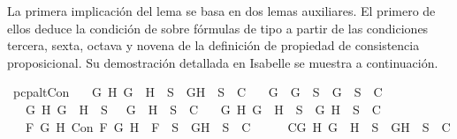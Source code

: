 \begin{isabellebody}
\begin{isamarkuptext}
  La primera implicación del lema se basa en dos lemas auxiliares. El primero de ellos 
  deduce la condición de  sobre fórmulas de tipo \isa{{\isasymalpha}} a partir de las condiciones tercera, sexta, 
  octava y novena de la definición de propiedad de consistencia proposicional. Su demostración 
  detallada en Isabelle se muestra a continuación.%
\end{isamarkuptext}\isamarkuptrue%
\isamarkupfalse%
\ pcp{\isacharunderscore}alt{}Con{\isacharcolon}\isanewline
\ \ \ {\isachardoublequoteopen}{\isacharparenleft}{\isasymforall}G\ H{\isachardot}\ G\ \isactrlbold {\isasymand}\ H\ {\isasymin}\ S\ {\isasymlongrightarrow}\ {\isacharbraceleft}G{\isacharcomma}H{\isacharbraceright}\ {\isasymunion}\ S\ {\isasymin}\ C{\isacharparenright}\isanewline
\ \ {\isasymand}\ {\isacharparenleft}{\isasymforall}G{\isachardot}\ \isactrlbold {\isasymnot}\ {\isacharparenleft}\isactrlbold {\isasymnot}G{\isacharparenright}\ {\isasymin}\ S\ {\isasymlongrightarrow}\ {\isacharbraceleft}G{\isacharbraceright}\ {\isasymunion}\ S\ {\isasymin}\ C{\isacharparenright}\isanewline
\ \ {\isasymand}\ {\isacharparenleft}{\isasymforall}G\ H{\isachardot}\ \isactrlbold {\isasymnot}{\isacharparenleft}G\ \isactrlbold {\isasymor}\ H{\isacharparenright}\ {\isasymin}\ S\ {\isasymlongrightarrow}\ {\isacharbraceleft}\isactrlbold {\isasymnot}\ G{\isacharcomma}\ \isactrlbold {\isasymnot}\ H{\isacharbraceright}\ {\isasymunion}\ S\ {\isasymin}\ C{\isacharparenright}\isanewline
\ \ {\isasymand}\ {\isacharparenleft}{\isasymforall}G\ H{\isachardot}\ \isactrlbold {\isasymnot}{\isacharparenleft}G\ \isactrlbold {\isasymrightarrow}\ H{\isacharparenright}\ {\isasymin}\ S\ {\isasymlongrightarrow}\ {\isacharbraceleft}G{\isacharcomma}\isactrlbold {\isasymnot}\ H{\isacharbraceright}\ {\isasymunion}\ S\ {\isasymin}\ C{\isacharparenright}{\isachardoublequoteclose}\isanewline
\ \ \ {\isachardoublequoteopen}{\isasymforall}F\ G\ H{\isachardot}\ Con\ F\ G\ H\ {\isasymlongrightarrow}\ F\ {\isasymin}\ S\ {\isasymlongrightarrow}\ {\isacharbraceleft}G{\isacharcomma}H{\isacharbraceright}\ {\isasymunion}\ S\ {\isasymin}\ C{\isachardoublequoteclose}\isanewline
%
\isadelimproof
%
\endisadelimproof
%
\isatagproof
{}\isamarkupfalse%
\ {\isacharminus}\isanewline
\ \ \isamarkupfalse%
\ C{}{\isacharcolon}{\isachardoublequoteopen}{\isasymforall}G\ H{\isachardot}\ G\ \isactrlbold {\isasymand}\ H\ {\isasymin}\ S\ {\isasymlongrightarrow}\ {\isacharbraceleft}G{\isacharcomma}H{\isacharbraceright}\ {\isasymunion}\ S\ {\isasymin}\ C{\isachardoublequoteclose}\isanewline

\end{isabellebody}
